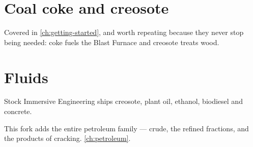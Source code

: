 \section{Coal coke and creosote}

Covered in \autoref{ch:getting-started}, and worth repeating because they never stop being needed:
coke fuels the Blast Furnace and creosote treats wood.

\section{Fluids}

Stock Immersive Engineering ships creosote, plant oil, ethanol, biodiesel and concrete.

\begin{iefork}
This fork adds the entire petroleum family --- crude, the refined fractions, and the products of
cracking. \autoref{ch:petroleum}.
\end{iefork}
